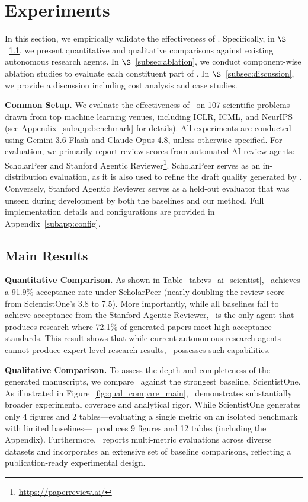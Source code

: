 \section{Experiments}\label{sec:experiments}

In this section, we empirically validate the effectiveness of \sname. Specifically, in $\S$~\ref{subsec:main_result}, we present quantitative and qualitative comparisons against existing autonomous research agents. In $\S$~\ref{subsec:ablation}, we conduct component-wise ablation studies to evaluate each constituent part of \sname. In $\S$~\ref{subsec:discussion}, we provide a discussion including cost analysis and case studies.

\noindent\textbf{Common Setup.} We evaluate the effectiveness of \sname\ on 107 scientific problems drawn from top machine learning venues, including ICLR, ICML, and NeurIPS (see Appendix~\ref{subapp:benchmark} for details). All experiments are conducted using Gemini 3.6 Flash and Claude Opus 4.8, unless otherwise specified. For evaluation, we primarily report review scores from automated AI review agents: ScholarPeer \citep{goyal2026scholarpeer} and Stanford Agentic Reviewer\footnote{\url{https://paperreview.ai/}}. ScholarPeer serves as an in-distribution evaluation, as it is also used to refine the draft quality generated by \sname. Conversely, Stanford Agentic Reviewer serves as a held-out evaluator that was unseen during development by both the baselines and our method. Full implementation details and configurations are provided in Appendix~\ref{subapp:config}.

\subsection{Main Results}\label{subsec:main_result}

\noindent\textbf{Quantitative Comparison.} As shown in Table~\ref{tab:vs_ai_scientist}, \sname~achieves a 91.9\% acceptance rate under ScholarPeer (nearly doubling the review score from ScientistOne's 3.8 to 7.5). More importantly, while all baselines fail to achieve acceptance from the Stanford Agentic Reviewer, \sname~is the only agent that produces research where 72.1\% of generated papers meet high acceptance standards. This result shows that while current autonomous research agents cannot produce expert-level research results, \sname~possesses such capabilities.


\noindent\textbf{Qualitative Comparison.}
To assess the depth and completeness of the generated manuscripts, we compare \sname~against the strongest baseline, ScientistOne. As illustrated in Figure~\ref{fig:qual_compare_main}, \sname~demonstrates substantially broader experimental coverage and analytical rigor. While ScientistOne generates only 4 figures and 2 tables—evaluating a single metric on an isolated benchmark with limited baselines—\sname~produces 9 figures and 12 tables (including the Appendix). Furthermore, \sname~reports multi-metric evaluations across diverse datasets and incorporates an extensive set of baseline comparisons, reflecting a publication-ready experimental design.

